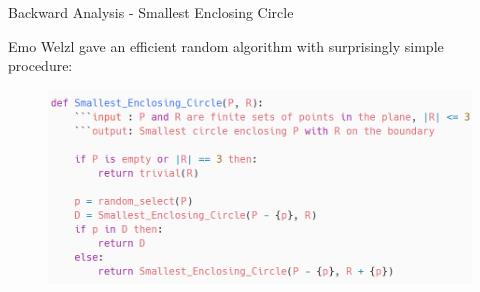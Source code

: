 \documentclass{beamer}
\newcommand{\lf}{\left[}
\newcommand{\rf}{\right]}
\begin{document}
\begin{frame}{Backward Analysis - Smallest Enclosing Circle}
    
    Emo Welzl gave an efficient random algorithm with surprisingly simple procedure:

    \begin{figure}[h]
        \includegraphics[width=1.0\linewidth]{pics/smallest_enclosing_circle_psudocode.png}
    \end{figure}






    
\end{frame}
\end{document}
